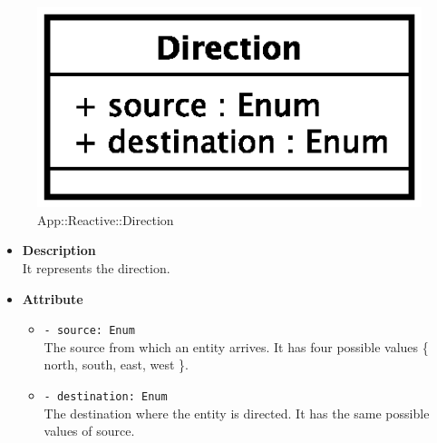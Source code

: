 \begin{figure}[h]
\centering
\includegraphics[scale=0.6,keepaspectratio]{images/solution/direction.eps}
\caption{App::Reactive::Direction}
\label{fig:sd-app-direction}
\end{figure}
\FloatBarrier
\begin{itemize}
  \item \textbf{Description} \\
    It represents the direction. 
  \item \textbf{Attribute}
  \begin{itemize}
    \item \texttt{- source: Enum} \\
The source from which an entity arrives. It has four possible
values \{ north, south, east, west \}.
    \item \texttt{- destination: Enum} \\
The destination where the entity is directed. It has the same possible
values of source.
  \end{itemize}
\end{itemize}

